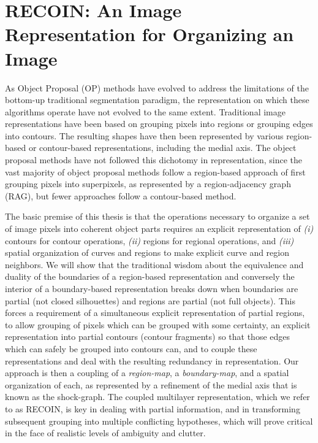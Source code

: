 \section{RECOIN: An Image Representation for Organizing an Image}
\label{sec:atomic:fragments}

As Object Proposal (OP) methods have evolved to address the limitations of the bottom-up traditional segmentation paradigm, the representation on which these algorithms operate have not evolved to the same extent. Traditional image representations have been based on grouping pixels into regions or grouping edges into contours. The resulting shapes have then been represented by various region-based or contour-based representations, including the medial axis. The object proposal methods have not followed this dichotomy in representation, since the vast majority of object proposal methods follow a region-based approach of first grouping pixels into superpixels, as represented by a region-adjacency graph (RAG), but fewer approaches follow a contour-based method. 

The basic premise of this thesis is that the operations necessary to organize a set of image pixels into coherent object parts requires an explicit representation of \emph{(i)} contours for contour operations, \emph{(ii)} regions for regional operations, and \emph{(iii)} spatial organization of curves and regions to make explicit curve and region neighbors. We will show that the traditional wisdom about the equivalence and duality of the boundaries of a region-based representation and conversely the interior of a boundary-based representation breaks down when boundaries are partial (not closed silhouettes) and regions are partial (not full objects). This forces a requirement of a simultaneous explicit representation of partial regions, to allow grouping of pixels which can be grouped with some certainty, an explicit representation into partial contours (contour fragments) so that those edges which can safely be grouped into contours can, and to couple these representations and deal with the resulting redundancy in representation. Our approach is then a coupling of a \emph{region-map}, a \emph{boundary-map}, and a spatial organization of each, as represented by a refinement of the medial axis that is known as the shock-graph. The coupled multilayer representation, which we refer to as RECOIN, is key in dealing with partial information, and in transforming subsequent grouping into multiple conflicting hypotheses, which will prove critical in the face of realistic levels of ambiguity and clutter.


